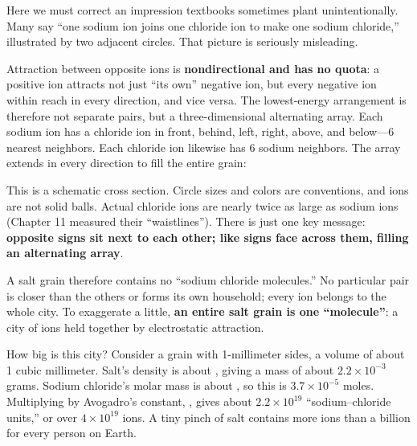 Here we must correct an impression textbooks sometimes plant unintentionally. Many say ``one sodium ion joins one chloride ion to make one sodium chloride,'' illustrated by two adjacent circles. That picture is seriously misleading.

Attraction between opposite ions is \textbf{nondirectional and has no quota}: a positive ion attracts not just ``its own'' negative ion, but every negative ion within reach in every direction, and vice versa. The lowest-energy arrangement is therefore not separate pairs, but a three-dimensional alternating array. Each sodium ion has a chloride ion in front, behind, left, right, above, and below---6 nearest neighbors. Each chloride ion likewise has 6 sodium neighbors. The array extends in every direction to fill the entire grain:

\begin{center}
\end{center}

This is a schematic cross section. Circle sizes and colors are conventions, and ions are not solid balls. Actual chloride ions are nearly twice as large as sodium ions (Chapter 11 measured their ``waistlines''). There is just one key message: \textbf{opposite signs sit next to each other; like signs face across them, filling an alternating array}.

A salt grain therefore contains no ``sodium chloride molecules.'' No particular pair is closer than the others or forms its own household; every ion belongs to the whole city. To exaggerate a little, \textbf{an entire salt grain is one ``molecule''}: a city of ions held together by electrostatic attraction.

How big is this city? Consider a grain with 1-millimeter sides, a volume of about 1 cubic millimeter. Salt's density is about , giving a mass of about $2.2\times 10^{-3}$ grams. Sodium chloride's molar mass is about , so this is $3.7\times 10^{-5}$ moles. Multiplying by Avogadro's constant, , gives about $2.2\times 10^{19}$ ``sodium--chloride units,'' or over $4\times 10^{19}$ ions. A tiny pinch of salt contains more ions than a billion for every person on Earth.

